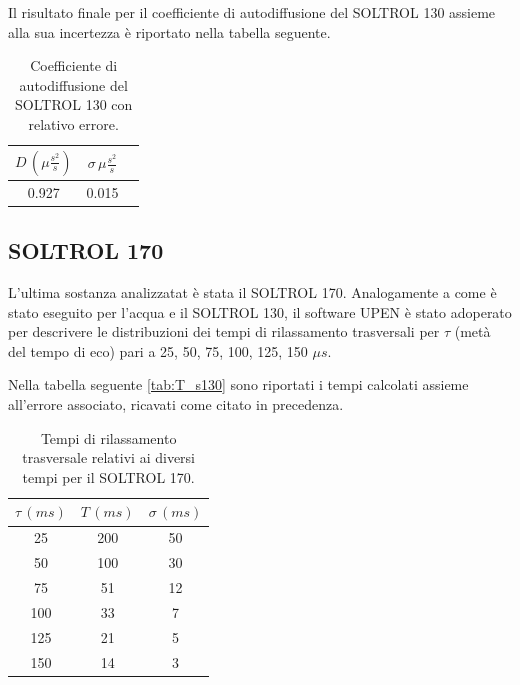 Il risultato finale per il coefficiente di autodiffusione del SOLTROL 130 assieme alla sua incertezza è riportato nella tabella seguente.

\begin{table}[h!]
    \begin{center}
    \begin{tabular}{c c c}
    \toprule
    	$D\,({\mu}\frac{s^2}{s})$ & $\sigma\,{\mu}\frac{s^2}{s}$ \\
    \midrule
    	0.927	&	0.015	\\
    \bottomrule
    \end{tabular}
    \caption{Coefficiente di autodiffusione del SOLTROL 130 con relativo errore.}
    \label{tab:Df_s130}
    \end{center}
\end{table}


\subsection*{SOLTROL 170}

L'ultima sostanza analizzatat è stata il SOLTROL 170.
Analogamente a come è stato eseguito per l'acqua e il SOLTROL 130, il software UPEN è stato adoperato per descrivere le distribuzioni dei tempi di rilassamento trasversali per $\tau$ (metà del tempo di eco) pari a 25, 50, 75, 100, 125, 150 ${\mu}s$.

Nella tabella seguente \ref{tab:T_s130} sono riportati i tempi calcolati assieme all'errore associato, ricavati come citato in precedenza.

\begin{table}[h!]
    \begin{center}
    \begin{tabular}{c c c}
    \toprule
    	${\tau}\,(ms)$ & $T\,(ms)$ & ${\sigma}\,(ms)$ \\
    \midrule
	 25 & 200 & 50 \\
	 50 & 100 & 30 \\
	 75 & 51 & 12 \\
	 100 & 33 & 7 \\
	 125 & 21 & 5 \\
	 150 & 14 & 3 \\
    \bottomrule
    \end{tabular}
    \caption{Tempi di rilassamento trasversale relativi ai diversi tempi \tau per il SOLTROL 170.}
    \label{tab:T_s170}
    \end{center}
\end{table}

